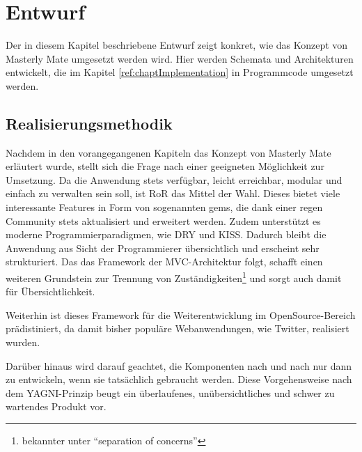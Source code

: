 \chapter{Entwurf}\label{ref:chaptScript}
Der in diesem Kapitel beschriebene Entwurf zeigt konkret, wie das Konzept von
Masterly Mate umgesetzt werden wird. Hier werden Schemata und Architekturen
entwickelt, die im Kapitel \ref{ref:chaptImplementation} in Programmcode
umgesetzt werden.

\section{Realisierungsmethodik}
Nachdem in den vorangegangenen Kapiteln das Konzept von Masterly Mate erläutert
wurde, stellt sich die Frage nach einer geeigneten Möglichkeit zur Umsetzung. Da
die Anwendung stets verfügbar, leicht erreichbar, modular und einfach zu
verwalten sein soll, ist \ac{RoR} das Mittel der Wahl. Dieses bietet viele
interessante Features in Form von sogenannten gems, die dank einer regen
Community stets aktualisiert und erweitert werden. Zudem unterstützt es moderne
Programmierparadigmen, wie \ac{DRY} und \ac{KISS}. Dadurch bleibt die Anwendung
aus Sicht der Programmierer übersichtlich und erscheint sehr strukturiert. Das
das Framework der \ac{MVC}-Architektur folgt, schafft einen weiteren Grundstein
zur Trennung von Zuständigkeiten\footnote{bekannter unter "`separation of
concerns"'} und sorgt auch damit für Übersichtlichkeit. 

Weiterhin ist dieses Framework für die Weiterentwicklung im
OpenSource-Bereich prädistiniert, da damit bisher populäre
Webanwendungen, wie Twitter, realisiert wurden.

Darüber hinaus wird darauf geachtet, die Komponenten nach und nach nur dann zu
entwickeln, wenn sie tatsächlich gebraucht werden. Diese Vorgehensweise nach dem
\ac{YAGNI}-Prinzip beugt ein überlaufenes, unübersichtliches und schwer
zu wartendes Produkt vor.

